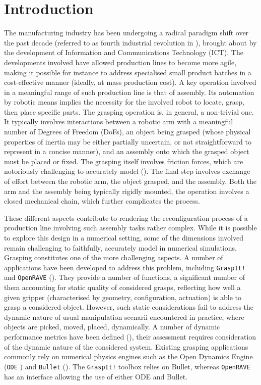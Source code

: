 \section{Introduction}\label{sec:introduction}
%
The manufacturing industry has been undergoing a radical paradigm shift over the past decade (referred to as fourth industrial revolution in \cite{schuh2017}), brought about by the development of Information and Communications Technology (ICT). The developments involved have allowed production lines to become more agile, making it possible for instance to address specialised small product batches in a cost-effective manner (ideally, at mass production cost). A key operation involved in a meaningful range of such production line is that of assembly. Its automation by robotic means implies the necessity for the involved robot to locate, grasp, then place specific parts. The grasping operation is, in general, a non-trivial one. It typically involves interactions between a robotic arm with a meaningful number of Degrees of Freedom (DoFs), an object being grasped (whose physical properties of inertia may be either partially uncertain, or not straightforward to represent in a concise manner), and an assembly onto which the grasped object must be placed or fixed. The grasping itself involves friction forces, which are notoriously challenging to accurately model (\cite{haessig1991}). The final step involves exchange of effort between the robotic arm, the object grasped, and the assembly. Both the arm and the assembly being typically rigidly mounted, the operation involves a closed mechanical chain, which further complicates the process.

These different aspects contribute to rendering the reconfiguration process of a production line involving such assembly tasks rather complex. While it is possible to explore this design in a numerical setting, some of the dimensions involved remain challenging to faithfully, accurately model in numerical simulations. Grasping constitutes one of the more challenging aspects. A number of applications have been developed to address this problem, including \texttt{GraspIt!} and \texttt{OpenRAVE} (\cite{graspit, openrave}). They provide a number of functions, a significant number of them accounting for static quality of considered grasps, reflecting how well a given gripper (characterised by geometry, configuration, actuation) is able to grasp a considered object. However, such static considerations fail to address the dynamic nature of usual manipulation scenarii encountered in practice, where objects are picked, moved, placed, dynamically. A number of dynamic performance metrics have been defined (\cite{roa_grasp_metrics}), their assessment requires consideration of the dynamic nature of the considered system. Existing grasping applications commonly rely on numerical physics engines such as the Open Dynamics Engine (\texttt{ODE} \cite{smith2005}) and \texttt{Bullet} (\cite{bullet_physics_library}). The \texttt{GraspIt!} toolbox relies on Bullet, whereas \texttt{OpenRAVE} has an interface allowing the use of either ODE and Bullet.

